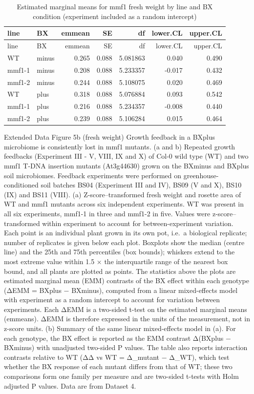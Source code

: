 \documentclass[
  10pt,
]{article}
\begin{document}
\begin{longtable}[]{@{}llrrrrr@{}}
\caption{Estimated marginal means for mmf1 fresh weight by line and BX
condition (experiment included as a random intercept)}\tabularnewline
\toprule\noalign{}
line & BX & emmean & SE & df & lower.CL & upper.CL \\
\midrule\noalign{}
\endfirsthead
\toprule\noalign{}
line & BX & emmean & SE & df & lower.CL & upper.CL \\
\midrule\noalign{}
\endhead
\bottomrule\noalign{}
\endlastfoot
WT & minus & 0.265 & 0.088 & 5.081863 & 0.040 & 0.490 \\
mmf1-1 & minus & 0.208 & 0.088 & 5.233357 & -0.017 & 0.432 \\
mmf1-2 & minus & 0.244 & 0.088 & 5.108075 & 0.020 & 0.469 \\
WT & plus & 0.318 & 0.088 & 5.076884 & 0.093 & 0.542 \\
mmf1-1 & plus & 0.216 & 0.088 & 5.234357 & -0.008 & 0.440 \\
mmf1-2 & plus & 0.239 & 0.088 & 5.106284 & 0.015 & 0.464 \\
\end{longtable}

Extended Data Figure 5b (fresh weight) \textbar{} Growth feedback in a
BXplus microbiome is consistently lost in mmf1 mutants. (a and b)
Repeated growth feedbacks (Experiment III - V, VIII, IX and X) of Col-0
wild type (WT) and two mmf1 T-DNA insertion mutants (At3g44630) grown on
the BXminus and BXplus soil microbiomes. Feedback experiments were
performed on greenhouse-conditioned soil batches BS04 (Experiment III
and IV), BS09 (V and X), BS10 (IX) and BS11 (VIII). (a)
Z-score--transformed fresh weight and rosette area of WT and mmf1
mutants across six independent experiments. WT was present in all six
experiments, mmf1-1 in three and mmf1-2 in five. Values were
z-score--transformed within experiment to account for between-experiment
variation. Each point is an individual plant grown in its own pot,
i.e.~a biological replicate; number of replicates is given below each
plot. Boxplots show the median (centre line) and the 25th and 75th
percentiles (box bounds); whiskers extend to the most extreme value
within 1.5 × the interquartile range of the nearest box bound, and all
plants are plotted as points. The statistics above the plots are
estimated marginal mean (EMM) contrasts of the BX effect within each
genotype (ΔEMM = BXplus − BXminus), computed from a linear mixed-effects
model with experiment as a random intercept to account for variation
between experiments. Each ΔEMM is a two-sided t-test on the estimated
marginal means (emmeans). ΔEMM is therefore expressed in the units of
the measurement, not in z-score units. (b) Summary of the same linear
mixed-effects model in (a). For each genotype, the BX effect is reported
as the EMM contrast Δ(BXplus − BXminus) with unadjusted two-sided P
values. The table also reports interaction contrasts relative to WT (ΔΔ
vs WT = Δ\_mutant − Δ\_WT), which test whether the BX response of each
mutant differs from that of WT; these two comparisons form one family
per measure and are two-sided t-tests with Holm adjusted P values. Data
are from Dataset 4.
\end{document}
